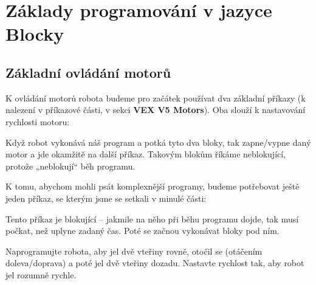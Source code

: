 \documentclass[../main.tex]{subfiles}
\begin{document}
	\section{Základy programování v jazyce Blocky}


	\subsection{Základní ovládání motorů}
	K ovládání motorů robota budeme pro začátek používat dva základní příkazy (k nalezení v příkazové části, v sekci \textbf{VEX V5 Motors}). Oba slouží k nastavování rychlosti motoru:
	\begin{itemize}
		\blockMotorStart
		\blockMotorStop
	\end{itemize}

	Když robot vykonává náš program a potká tyto dva bloky, tak zapne/vypne daný motor a jde okamžitě na další příkaz. Takovým blokům říkáme neblokující, protože „neblokují“ běh programu.

	K tomu, abychom mohli psát komplexnější programy, budeme potřebovat ještě jeden příkaz, se kterým jsme se setkali v minulé části:
	\begin{itemize}
		\blockWait
	\end{itemize}

	Tento příkaz je blokující -- jakmile na něho při běhu programu dojde, tak musí počkat, než uplyne zadaný čas. Poté se začnou vykonávat bloky pod ním.

	\begin{question}\label{que:basic}%
		Naprogramujte robota, aby jel dvě vteřiny rovně, otočil se (otáčením doleva/doprava) a poté jel dvě vteřiny dozadu. Nastavte rychlost tak, aby robot jel rozumně rychle.
	\end{question}
\end{document}
